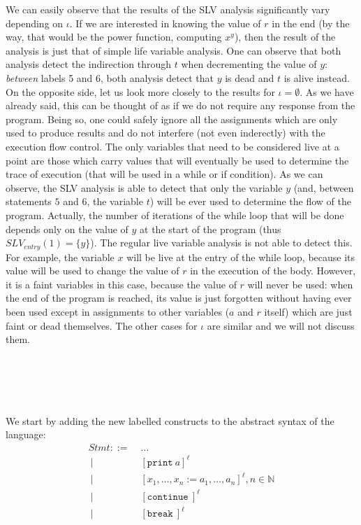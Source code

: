 \documentclass[a4wide,12pt]{article}
\def\N{\mathbb{N}}
\def\print{\texttt{print}\ }
\def\cont {\texttt{continue}\ }
\def\breakc{\texttt{break}\ }
\begin{document}
We can easily observe that the results of the SLV analysis significantly vary depending on $\iota$. 
If we are interested in knowing the value of $r$ in the end (by the way, that would be the power
function, computing $x^y$), then the result of the analysis is
just that of simple life variable analysis. One can observe that both analysis detect the indirection
through $t$ when decrementing the value of $y$: \emph{between} labels 5 and 6,
both analysis detect that $y$ is dead and $t$ is alive instead. On the opposite side, let us look
more closely to the results for $\iota = \emptyset$. As we have already said, this can be
thought of as if we do not require any response from the program. Being so, one could
safely ignore all the assignments
which are only used to 
produce results and do not interfere (not even inderectly) with the execution flow control.
The only variables that need
to be considered live at a point are those which carry values that will eventually be used
to determine the trace of execution (that will be used in a while or if condition). As we can observe,
the SLV analysis is able to detect that only the variable $y$ (and, between statements $5$ and $6$, 
the variable $t$) will be ever used to determine the flow of the program. Actually, the number of iterations of the while loop that will be done depends only on the value of $y$ at the start of the program
(thus $SLV_{entry}(1) = \{y\}$). The regular live variable analysis is not able to detect this.
For example, the variable $x$ will be live at the entry of the
while loop, because its value will be used to change the value of $r$ in the execution of the body.
However, it is a faint variables in this case, because the value of $r$ will never be used:
when the end of the program is reached, its value is just forgotten without having ever been used
except in assignments to other variables ($a$ and $r$ itself) which are just faint or dead themselves.
The other cases for $\iota$ are similar and we will not discuss them.


\section{~}
 
We start by adding the new labelled constructs to the abstract syntax of the language:
\begin{align*}
 Stmt ::= \; & \ldots \\
 ~ |\;\; & [\print a]^\ell \\
 ~ |\;\; & [x_1,\ldots,x_n := a_1,\ldots,a_n]^\ell , n \in \N \\
 ~ |\;\; & [\cont]^\ell \\
 ~ |\;\; & [\breakc]^\ell
\end{align*}
 
\end{document}

